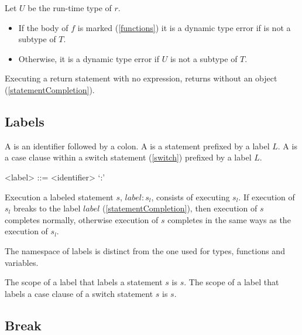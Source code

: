 \documentclass[makeidx]{article}
\begin{document}
{\LMHash{}%
Let $U$ be the run-time type of $r$.
\begin{itemize}
\item
  If the body of $f$ is marked \ASYNC{} (\ref{functions})
  it is a dynamic type error if  is not a subtype of $T$.
\item
  Otherwise, it is a dynamic type error if $U$ is not a subtype of $T$.
\end{itemize}

\LMHash{}%
Executing a return statement with no expression,
\code{\RETURN;}
returns without an object
(\ref{statementCompletion}).


\subsection{Labels}

\LMHash{}%
A  is an identifier followed by a colon.
A  is a statement prefixed by a label $L$.
A  is a case clause within a switch statement (\ref{switch}) prefixed by a label $L$.


\begin{grammar}
<label> ::= <identifier> `:'
\end{grammar}

\LMHash{}%
Execution a labeled statement $s$, $label: s_l$, consists of executing $s_l$.
If execution of $s_l$ breaks to the label $label$ (\ref{statementCompletion}),
then execution of $s$ completes normally,
otherwise execution of $s$ completes in the same ways as the execution of $s_l$.

\LMHash{}%
The namespace of labels is distinct from the one used for types, functions and variables.

\LMHash{}%
The scope of a label that labels a statement $s$ is $s$.
The scope of a label that labels a case clause of a switch statement $s$ is $s$.



\subsection{Break}

}
\end{document}
